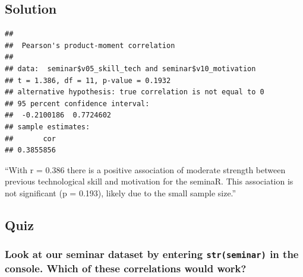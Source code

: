 \documentclass[
]{book}
\newenvironment{Shaded}{\begin{snugshade}}{\end{snugshade}}
\newcommand{\FunctionTok}[1]{\textcolor[rgb]{0.13,0.29,0.53}{\textbf{#1}}}
\newcommand{\NormalTok}[1]{#1}
\newcommand{\SpecialCharTok}[1]{\textcolor[rgb]{0.81,0.36,0.00}{\textbf{#1}}}
\begin{document}
\subsection{\texorpdfstring{Solution }{Solution  }}\label{solution-12}

\begin{Shaded}
\end{Shaded}

\begin{verbatim}
## 
##  Pearson's product-moment correlation
## 
## data:  seminar$v05_skill_tech and seminar$v10_motivation
## t = 1.386, df = 11, p-value = 0.1932
## alternative hypothesis: true correlation is not equal to 0
## 95 percent confidence interval:
##  -0.2100186  0.7724602
## sample estimates:
##       cor 
## 0.3855856
\end{verbatim}

``With r = 0.386 there is a positive association of moderate strength between previous technological skill and motivation for the seminaR. This association is not significant (p = 0.193), likely due to the small sample size.''

\subsection{Quiz}\label{quiz}

\subsubsection{\texorpdfstring{Look at our seminar dataset by entering \texttt{str(seminar)} in the console. Which of these correlations would work?}{Look at our seminar dataset by entering str(seminar) in the console. Which of these correlations would work?}}\label{look-at-our-seminar-dataset-by-entering-strseminar-in-the-console.-which-of-these-correlations-would-work}
\end{document}
